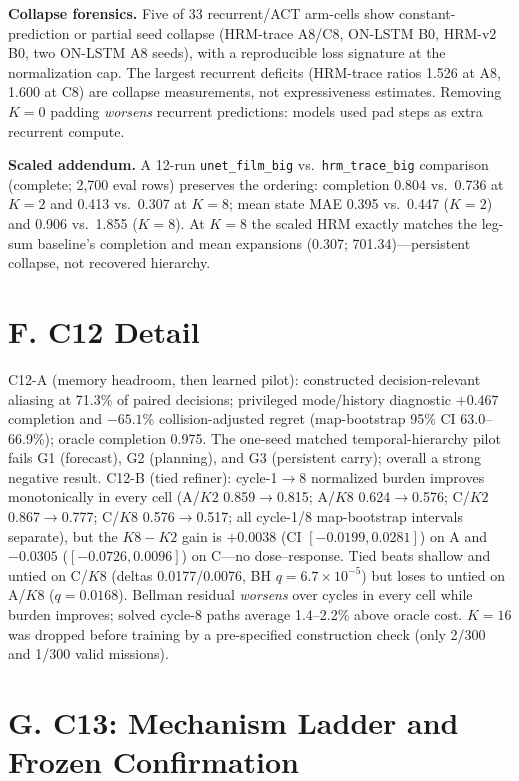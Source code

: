 \documentclass[letterpaper]{article} %
\newcommand{\stage}[1]{\textsc{#1}}
\begin{document}
\textbf{Collapse forensics.} Five of 33 recurrent/ACT arm-cells show constant-prediction or partial seed collapse (HRM-trace A8/C8, ON-LSTM B0, HRM-v2 B0, two ON-LSTM A8 seeds), with a reproducible loss signature at the normalization cap. The largest recurrent deficits (HRM-trace ratios 1.526 at A8, 1.600 at C8) are collapse measurements, not expressiveness estimates. Removing $K{=}0$ padding \emph{worsens} recurrent predictions: models used pad steps as extra recurrent compute.

\textbf{Scaled addendum.} A 12-run \texttt{unet\_film\_big} vs.\ \texttt{hrm\_trace\_big} comparison (complete; 2{,}700 eval rows) preserves the ordering: completion 0.804 vs.\ 0.736 at $K{=}2$ and 0.413 vs.\ 0.307 at $K{=}8$; mean state MAE 0.395 vs.\ 0.447 ($K{=}2$) and 0.906 vs.\ 1.855 ($K{=}8$). At $K{=}8$ the scaled HRM exactly matches the leg-sum baseline's completion and mean expansions (0.307; 701.34)---persistent collapse, not recovered hierarchy.

\section{F. \stage{C12} Detail}

\stage{C12-A} (memory headroom, then learned pilot): constructed decision-relevant aliasing at 71.3\% of paired decisions; privileged mode/history diagnostic $+0.467$ completion and $-65.1$\% collision-adjusted regret (map-bootstrap 95\% CI 63.0--66.9\%); oracle completion 0.975. The one-seed matched temporal-hierarchy pilot fails G1 (forecast), G2 (planning), and G3 (persistent carry); overall a strong negative result. \stage{C12-B} (tied refiner): cycle-1$\to$8 normalized burden improves monotonically in every cell (A/$K2$ 0.859$\to$0.815; A/$K8$ 0.624$\to$0.576; C/$K2$ 0.867$\to$0.777; C/$K8$ 0.576$\to$0.517; all cycle-1/8 map-bootstrap intervals separate), but the $K8{-}K2$ gain is $+0.0038$ (CI $[-0.0199, 0.0281]$) on A and $-0.0305$ ($[-0.0726, 0.0096]$) on C---no dose--response. Tied beats shallow and untied on C/$K8$ (deltas 0.0177/0.0076, BH $q{=}6.7{\times}10^{-5}$) but loses to untied on A/$K8$ ($q{=}0.0168$). Bellman residual \emph{worsens} over cycles in every cell while burden improves; solved cycle-8 paths average 1.4--2.2\% above oracle cost. $K{=}16$ was dropped before training by a pre-specified construction check (only 2/300 and 1/300 valid missions).

\section{G. C13: Mechanism Ladder and Frozen Confirmation}
\end{document}
